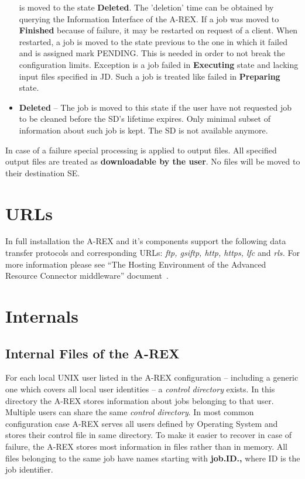 \documentclass{article}                            %
\begin{document}
\begin{itemize}
is moved to the state \textbf{Deleted}. The 'deletion' time can be
obtained by querying the Information Interface of the A-REX. If a
job was moved to \textbf{Finished} because of failure, it may be restarted
on request of a client. When restarted, a job is moved to the state
previous to the one in which it failed and is assigned mark PENDING.
This is needed in order to not break the configuration limits. Exception
is a job failed in \textbf{Executing} state and lacking input files
specified in JD. Such a job is treated like failed in \textbf{Preparing}
state.
\item \textbf{Deleted} -- The job is moved to this state if the user have
not requested job to be cleaned before the SD's lifetime expires.
Only minimal subset of information about such job is kept. The SD
is not available anymore.
\end{itemize}
In case of a failure special processing is applied to output files.
All specified output files are treated as \textbf{downloadable by
the user}. No files will be moved to their destination SE.

\section{URLs\label{sec:urls}}

In full installation the A-REX and it's components support the following
data transfer protocols and corresponding URLs: \emph{ftp, gsiftp,
http, https, lfc} and \emph{rls.} For more information please see
{}``The Hosting Environment of the Advanced Resource Connector middleware''
document~\cite{hed}.

\section{Internals\label{section:internals}}

\subsection{Internal Files of the A-REX}

For each local UNIX user listed in the A-REX configuration -- including
a generic one which covers all local user identities -- a \textit{control
directory} exists. In this directory the A-REX stores information
about jobs belonging to that user. Multiple users can share the same
\textit{control directory}. In most common configuration case A-REX
serves all users defined by Operating System and stores their control
file in same directory. To make it easier to recover in case of failure,
the A-REX stores most information in files rather than in memory.
All files belonging to the same job have names starting with \textbf{job.ID.,}
where ID is the job identifier.
\end{document}
